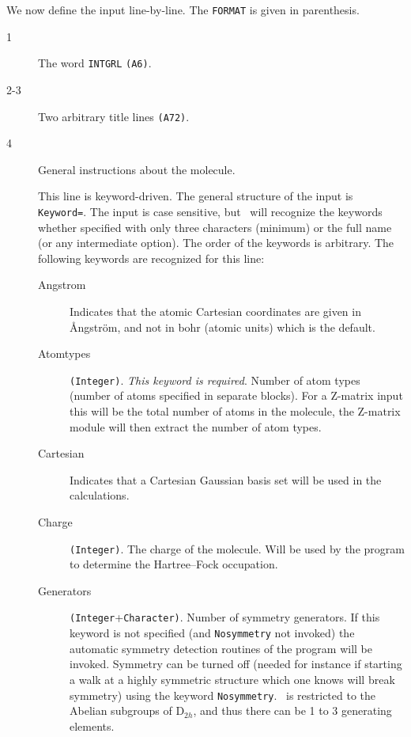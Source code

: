 We now define the input line-by-line.  The {\tt FORMAT} is given
in parenthesis.
\begin{description}
\item[1] The word \verb|INTGRL| {\tt (A6)}.
\item[2-3] Two arbitrary title lines {\tt (A72)}.
\item[4] General instructions about the molecule.

This line is keyword-driven. The general structure of the input is
\verb|Keyword=|. The input is case sensitive, but \dalton\ will recognize
the keywords whether specified with only three characters (minimum) or
the full name (or any intermediate option). The order of the keywords
is arbitrary. The following keywords are recognized for this line:
\begin{description}
\item[Angstrom] Indicates that the atomic Cartesian coordinates are
  given in \AA ngstr\"{o}m, and not in bohr (atomic units) which is
  the default.
\item[Atomtypes] \verb|(Integer)|. {\em This keyword is
  required\/}. Number of atom types (number of atoms specified 
in separate blocks). For a Z-matrix input this will be the total
number of atoms in the molecule, the Z-matrix module will then
extract the number of atom types.
\item[Cartesian] Indicates that a Cartesian Gaussian basis set will be
  used in the calculations.
\item[Charge] \verb|(Integer)|. The charge of the molecule. Will be used  by the program to determine the Hartree--Fock
occupation.
\item[Generators] \verb|(Integer|+\verb|Character)|. Number of symmetry
  generators. If this keyword is not
  specified (and \verb|Nosymmetry| not invoked)
  the automatic symmetry detection routines of the program will be
invoked. Symmetry can be turned off (needed for instance if starting a
walk at a highly symmetric structure which one knows will break
symmetry) using the keyword \verb|Nosymmetry|. \dalton\ is restricted
  to the Abelian subgroups of D$_{2h}$, and thus there can be 1 to 3
  generating elements.


\end{description}
\end{description}
